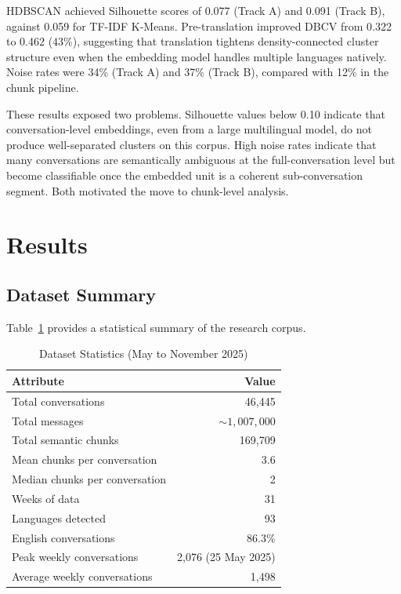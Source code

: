 \documentclass[conference]{IEEEtran}
\begin{document}
HDBSCAN achieved Silhouette scores of 0.077 (Track A) and 0.091 (Track B), against 0.059 for TF-IDF K-Means. Pre-translation improved DBCV from 0.322 to 0.462 (43\%), suggesting that translation tightens density-connected cluster structure even when the embedding model handles multiple languages natively. Noise rates were 34\% (Track A) and 37\% (Track B), compared with 12\% in the chunk pipeline.

These results exposed two problems. Silhouette values below 0.10 indicate that conversation-level embeddings, even from a large multilingual model, do not produce well-separated clusters on this corpus. High noise rates indicate that many conversations are semantically ambiguous at the full-conversation level but become classifiable once the embedded unit is a coherent sub-conversation segment. Both motivated the move to chunk-level analysis.

\section{Results}
\label{sec:results}

\subsection{Dataset Summary}

Table~\ref{tab:dataset} provides a statistical summary of the research corpus.

\begin{table}[!t]
\caption{Dataset Statistics (May to November 2025)}
\label{tab:dataset}
\centering
\begin{tabular}{lr}
\toprule
Attribute & Value \\
\midrule
Total conversations              & 46{,}445 \\
Total messages                   & ${\sim}1{,}007{,}000$ \\
Total semantic chunks            & 169{,}709 \\
Mean chunks per conversation     & 3.6 \\
Median chunks per conversation   & 2 \\
Weeks of data                    & 31 \\
Languages detected               & 93 \\
English conversations            & 86.3\% \\
Peak weekly conversations        & 2{,}076 (25 May 2025) \\
Average weekly conversations     & 1{,}498 \\
\bottomrule
\end{tabular}
\end{table}
\end{document}
